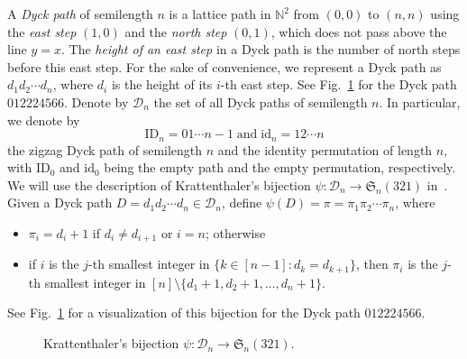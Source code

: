 \documentclass[12pt]{amsart}
\numberwithin{equation}{section}
\theoremstyle{plain}
\theoremstyle{definition}
\newcommand{\N}{\mathbb{N}}
\def\id{\mathrm{id}}
\def\ID{\mathrm{ID}}
\def\S{\mathfrak{S}}
\begin{document}
A {\em Dyck path} of semilength $n$ is a lattice path in $\N^2$ from $(0,0)$ to
$(n,n)$ using the {\em east step} $(1,0)$ and the {\em north step} $(0,1)$, which does
not pass above the line $y=x$. The {\em height of an east step} in a Dyck path is the number of north steps before this east step. For the sake of convenience, we represent a Dyck path  as $d_1d_2\cdots d_n$, where $d_i$ is the height of its $i$-th east step. See Fig.~\ref{ex:varphi} for the Dyck path $012224566$. Denote by $\mathcal{D}_n$ the set of all Dyck paths of semilength $n$. In particular, we denote by $$\ID_n=01\cdots n-1\;\text{and}\; \id_n=12\cdots n$$ the zigzag Dyck path of semilength $n$ and the identity permutation of length $n$, with $\ID_0$ and $\id_0$ being the empty path and the empty permutation, respectively. We will use the description of Krattenthaler's bijection  $\psi:\mathcal{D}_n\rightarrow\S_n(321)$ in~\cite{kl}. Given a Dyck path $D=d_1d_2\cdots d_n\in\mathcal{D}_n$,  define $\psi(D)=\pi=\pi_1\pi_2\cdots\pi_n$, where 
\begin{itemize}
\item $\pi_i=d_i+1$ if $d_i\neq d_{i+1}$ or $i=n$; otherwise
\item  if $i$ is the $j$-th smallest integer in $\{k\in[n-1]: d_k=d_{k+1}\}$, then $\pi_i$ is the $j$-th smallest integer in $[n]\setminus\{d_1+1,d_2+1,\ldots,d_n+1\}$.
\end{itemize}
See Fig.~\ref{ex:varphi} for  a  visualization of this bijection for the Dyck path $012224566$.
\begin{figure}
\begin{center}
\end{center}
\caption{Krattenthaler's bijection $\psi:\mathcal{D}_n\rightarrow\S_n(321)$.}
\label{ex:varphi}
\end{figure}
\end{document}
